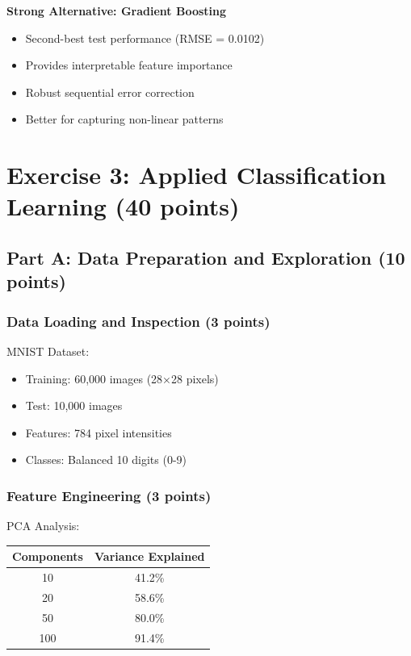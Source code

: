 \documentclass[12pt,a4paper]{article}
\theoremstyle{definition}
\begin{document}
\textbf{Strong Alternative: Gradient Boosting}
\begin{itemize}
\item Second-best test performance (RMSE = 0.0102)
\item Provides interpretable feature importance
\item Robust sequential error correction
\item Better for capturing non-linear patterns
\end{itemize}

\section{Exercise 3: Applied Classification Learning (40 points)}

\subsection{Part A: Data Preparation and Exploration (10 points)}

\subsubsection{Data Loading and Inspection (3 points)}

MNIST Dataset:
\begin{itemize}
\item Training: 60,000 images (28×28 pixels)
\item Test: 10,000 images
\item Features: 784 pixel intensities
\item Classes: Balanced 10 digits (0-9)
\end{itemize}

\subsubsection{Feature Engineering (3 points)}

PCA Analysis:
\begin{center}
\begin{tabular}{|c|c|}
\hline
\textbf{Components} & \textbf{Variance Explained} \\
\hline
10 & 41.2\% \\
20 & 58.6\% \\
50 & 80.0\% \\
100 & 91.4\% \\
\hline
\end{tabular}
\end{center}
\end{document}
